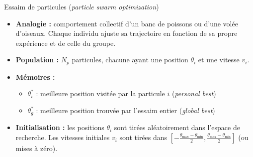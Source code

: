 \documentclass[11pt,aspectratio=169]{beamer}
\begin{document}
\begin{frame}{Essaim de particules (\textit{particle swarm optimization})}

\begin{itemize}

\item \textbf{Analogie :} comportement collectif d'un banc de poissons ou d'une volée d'oiseaux. Chaque individu ajuste sa trajectoire en fonction de sa propre expérience et de celle du groupe.\newline

\item \textbf{Population :} $N_p$ particules, chacune ayant une position $\theta_i$ et une vitesse $v_i$.\newline

\item \textbf{Mémoires :}
  \begin{itemize}
    \item $\theta_i^*$ : meilleure position visitée par la particule $i$ (\textit{personal best})\newline
    \item $\theta_g^*$ : meilleure position trouvée par l'essaim entier (\textit{global best})\newline
  \end{itemize}

\item \textbf{Initialisation :} les positions $\theta_i$ sont tirées aléatoirement dans l'espace de recherche. Les vitesses initiales $v_i$ sont tirées dans $\left[-\frac{\theta_{\max} - \theta_{\min}}{2}, \frac{\theta_{\max} - \theta_{\min}}{2}\right]$ (ou mises à zéro).

\end{itemize}

\end{frame}
\end{document}
